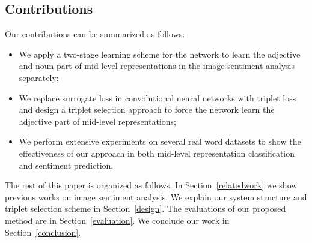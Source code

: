 \subsection{Contributions}
Our contributions can be summarized as follows:

\begin{itemize}
	\item We apply a two-stage learning scheme for the network to learn the adjective and noun part of mid-level representations in the image sentiment analysis separately;
	\item We replace surrogate loss in convolutional neural networks with triplet loss and design a triplet selection approach to force the network learn the adjective part of mid-level representations;
	\item We perform extensive experiments on several real word datasets to show the effectiveness of our approach in both mid-level representation classification and sentiment prediction.
\end{itemize}

The rest of this paper is organized as follows. In Section~\ref{relatedwork} we show previous works on image sentiment analysis.  
We explain our system structure and triplet selection scheme in Section~\ref{design}. 
The evaluations of our proposed method are in Section~\ref{evaluation}. 
We conclude our work in Section~\ref{conclusion}.
